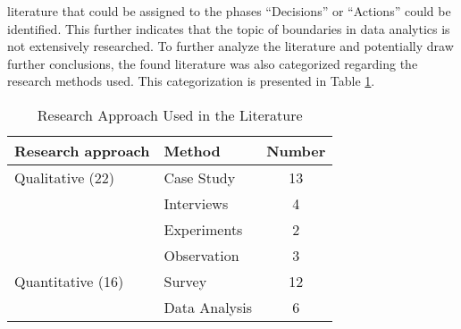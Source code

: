 literature that could be assigned to the phases \enquote{Decisions} or \enquote{Actions} could be identified. This further indicates that the topic of boundaries in data analytics is not extensively researched. To further analyze the literature and potentially draw further conclusions, the found literature was also categorized regarding the research methods used. This categorization is presented in Table \ref{researchMethod}.

\begin{table}[htbp]
    \centering
    \small
    \begin{tabular}{llc}
    \hline
    \multicolumn{1}{l}{Research approach} & \multicolumn{1}{l}{Method} & \multicolumn{1}{l}{Number} \\ \hline
    Qualitative (22)                      & Case Study                 & 13                         \\
                                          & Interviews                 & 4                          \\
                                          & Experiments                & 2                          \\
                                          & Observation                & 3                          \\
    Quantitative (16)                     & Survey                     & 12                         \\
                                          & Data Analysis              & 6                          \\ \hline
    \end{tabular}
    \caption{Research Approach Used in the Literature}
    \label{researchMethod}
    \end{table}


